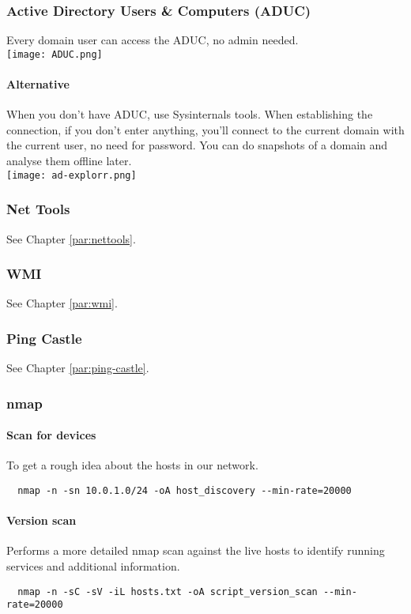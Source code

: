 \subsubsection{Active Directory Users \& Computers (ADUC)}
Every domain user can access the ADUC, no admin needed.\\
\texttt{[image: ADUC.png]}\\
\paragraph{Alternative}
When you don't have ADUC, use Sysinternals tools.
When establishing the connection, if you don't enter anything, you'll connect to the current domain with the
current user, no need for password.
You can do snapshots of a domain and analyse them offline later.\\
\texttt{[image: ad-explorr.png]}

\subsubsection{Net Tools}
See Chapter \ref{par:nettools}.

\subsubsection{WMI}
See Chapter \ref{par:wmi}.

\subsubsection{Ping Castle}
See Chapter \ref{par:ping-castle}.


\subsubsection{nmap}
\paragraph{Scan for devices}
To get a rough idea about the hosts in our network.
\begin{lstlisting}
  nmap -n -sn 10.0.1.0/24 -oA host_discovery --min-rate=20000
\end{lstlisting}

\paragraph{Version scan}
Performs a more detailed nmap scan against the live hosts to identify running services and additional information.
\begin{lstlisting}
  nmap -n -sC -sV -iL hosts.txt -oA script_version_scan --min-rate=20000
\end{lstlisting}

